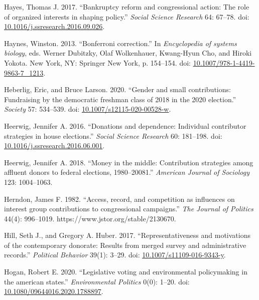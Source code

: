 \documentclass[12pt,]{article}
\newlength{\cslhangindent}
\newenvironment{CSLReferences}[2]%
    {\setlength{\parindent}{0pt}%
    \everypar{\setlength{\hangindent}{\cslhangindent}}\ignorespaces}%
    {\par}
\begin{document}
\begin{CSLReferences}{1}{0}
\leavevmode{}%
Hayes, Thomas J. 2017. {``Bankruptcy reform and congressional action:
The role of organized interests in shaping policy.''} \emph{Social
Science Research} 64: 67--78. doi:
\href{https://doi.org/10.1016/j.ssresearch.2016.09.026}{10.1016/j.ssresearch.2016.09.026}.

\leavevmode{}%
Haynes, Winston. 2013. {``Bonferroni correction.''} In
\emph{Encyclopedia of systems biology}, eds. Werner Dubitzky, Olaf
Wolkenhauer, Kwang-Hyun Cho, and Hiroki Yokota. New York, NY: Springer
New York, p. 154--154. doi:
\href{https://doi.org/10.1007/978-1-4419-9863-7_1213}{10.1007/978-1-4419-9863-7\_1213}.

\leavevmode{}%
Heberlig, Eric, and Bruce Larson. 2020. {``Gender and small
contributions: Fundraising by the democratic freshman class of 2018 in
the 2020 election.''} \emph{Society} 57: 534--539. doi:
\href{https://doi.org/10.1007/s12115-020-00528-w}{10.1007/s12115-020-00528-w}.

\leavevmode{}%
Heerwig, Jennifer A. 2016. {``Donations and dependence: Individual
contributor strategies in house elections.''} \emph{Social Science
Research} 60: 181--198. doi:
\href{https://doi.org/10.1016/j.ssresearch.2016.06.001}{10.1016/j.ssresearch.2016.06.001}.

\leavevmode{}%
Heerwig, Jennifer A. 2018. {``Money in the middle: Contribution
strategies among affluent donors to federal elections, 1980--20081.''}
\emph{American Journal of Sociology} 123: 1004--1063.

\leavevmode{}%
Herndon, James F. 1982. {``Access, record, and competition as influences
on interest group contributions to congressional campaigns.''} \emph{The
Journal of Politics} 44(4): 996--1019.
https://www.jstor.org/stable/2130670.

\leavevmode{}%
Hill, Seth J., and Gregory A. Huber. 2017. {``Representativeness and
motivations of the contemporary donorate: Results from merged survey and
administrative records.''} \emph{Political Behavior} 39(1): 3--29. doi:
\href{https://doi.org/10.1007/s11109-016-9343-y}{10.1007/s11109-016-9343-y}.

\leavevmode{}%
Hogan, Robert E. 2020. {``Legislative voting and environmental
policymaking in the american states.''} \emph{Environmental Politics}
0(0): 1--20. doi:
\href{https://doi.org/10.1080/09644016.2020.1788897}{10.1080/09644016.2020.1788897}.


\end{CSLReferences}
\end{document}
